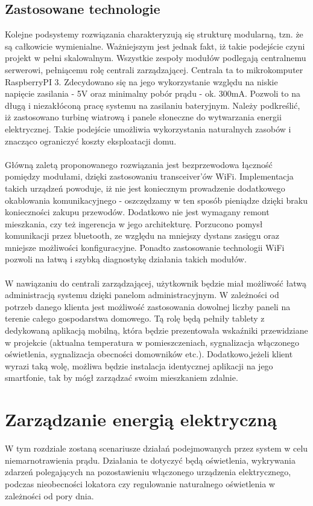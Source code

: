 \documentclass[12pt]{article} %
\begin{document}
\subsection{Zastosowane technologie}
Kolejne podsystemy rozwiązania charakteryzują się strukturę modularną, tzn. że są całkowicie wymienialne. Ważniejszym jest jednak fakt, iż takie podejście czyni projekt w pełni skalowalnym. Wszystkie zespoły modułów podlegają centralnemu serwerowi, pełniącemu rolę centrali zarządzającej. Centrala ta to mikrokomputer RaspberryPI 3. Zdecydowano się na jego wykorzystanie względu na niskie napięcie zasilania - 5V oraz minimalny pobór prądu - ok. 300mA. Pozwoli to na długą i niezakłóconą pracę systemu na zasilaniu bateryjnym. Należy podkreślić, iż zastosowano turbinę wiatrową i panele słoneczne do wytwarzania energii elektrycznej. Takie podejście umożliwia wykorzystania naturalnych zasobów i znacząco ograniczyć koszty eksploatacji domu.
\\ \\
Główną zaletą proponowanego rozwiązania jest bezprzewodowa łączność pomiędzy modułami, dzięki zastosowaniu transceiver'ów WiFi. Implementacja takich urządzeń powoduje, iż nie jest koniecznym prowadzenie dodatkowego okablowania komunikacyjnego - oszczędzamy w ten sposób pieniądze dzięki braku konieczności zakupu przewodów. Dodatkowo nie jest wymagany remont mieszkania, czy też ingerencja w jego architekturę. Porzucono pomysł komunikacji przez bluetooth, ze względu na mniejszy dystans zasięgu oraz mniejsze możliwości konfiguracyjne.
Ponadto zastosowanie technologii WiFi pozwoli na łatwą i szybką diagnostykę działania takich modułów.
\\ \\ 
W nawiązaniu do centrali zarządzającej, użytkownik będzie miał możliwość łatwą administracją systemu dzięki panelom administracyjnym. W zależności od potrzeb danego klienta jest możliwość zastosowania dowolnej liczby paneli na terenie całego gospodarstwa domowego. Tą rolę będą pełniły tablety z dedykowaną aplikacją mobilną, która będzie prezentowała wskaźniki przewidziane w projekcie (aktualna temperatura w pomieszczeniach, sygnalizacja włączonego oświetlenia, sygnalizacja obecności domowników etc.). Dodatkowo,jeżeli klient wyrazi taką wolę, możliwa będzie instalacja identycznej aplikacji na jego smartfonie, tak by mógł zarządzać swoim mieszkaniem zdalnie.

\section{Zarządzanie energią elektryczną}
W tym rozdziale zostaną scenariusze działań podejmowanych przez system w celu niemarnotrawienia prądu. Działania te dotyczyć będą oświetlenia, wykrywania zdarzeń polegających na pozostawieniu włączonego urządzenia elektrycznego, podczas nieobecności lokatora czy regulowanie naturalnego oświetlenia w zależności od pory dnia.
\end{document}
